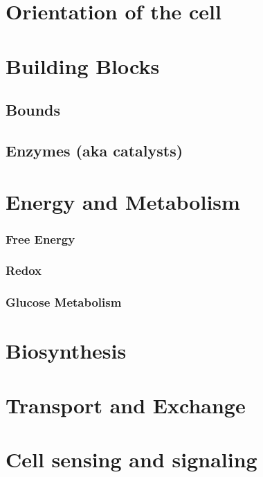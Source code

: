 \documentclass[12pt]{cheatsheet}
\author{Gian Maria Ernst - ernstg\\  \vspace*{0.2em} \vspace*{-0.2em}}\doctitle{Bioengineering}
\begin{document}
\small


\section*{Orientation of the cell}


\section*{Building Blocks}

\subsection*{Bounds}


\subsection*{Enzymes (aka catalysts)}


\section*{Energy and Metabolism}

\subsubsection*{Free Energy}

\subsubsection*{Redox}

\subsubsection*{Glucose Metabolism}

\section*{Biosynthesis}

\section*{Transport and Exchange}

\section*{Cell sensing and signaling}
\end{document}
